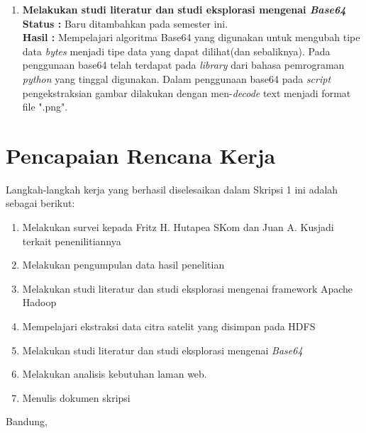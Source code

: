 \documentclass[a4paper,twoside]{article}
\begin{document}
\begin{enumerate}
		\item \textbf{Melakukan studi literatur dan studi eksplorasi mengenai \textit{Base64}}\\
		{\bf Status :} Baru ditambahkan pada semester ini.\\
		{\bf Hasil :} Mempelajari algoritma Base64 yang digunakan untuk mengubah tipe data \textit{bytes} menjadi tipe data yang dapat dilihat(dan sebaliknya). Pada penggunaan base64 telah terdapat pada \textit{library} dari bahasa pemrograman \textit{python} yang tinggal digunakan. Dalam penggunaan base64 pada \textit{script} pengekstraksian gambar dilakukan dengan men-\textit{decode} text menjadi format file ".png".
	\end{enumerate}

\section{Pencapaian Rencana Kerja}
Langkah-langkah kerja yang berhasil diselesaikan dalam Skripsi 1 ini adalah sebagai berikut:
\begin{enumerate}
\item Melakukan survei kepada Fritz H. Hutapea SKom dan Juan A. Kusjadi terkait penenilitiannya
\item Melakukan pengumpulan data hasil penelitian
\item Melakukan studi literatur dan studi eksplorasi mengenai framework Apache Hadoop
\item Mempelajari ekstraksi data citra satelit yang disimpan pada HDFS
\item Melakukan studi literatur dan studi eksplorasi mengenai \textit{Base64}
\item Melakukan analisis kebutuhan laman web.
\item Menulis dokumen skripsi
\end{enumerate}



\vspace{1cm}
\centering Bandung, \tanggal\\
\vspace{2cm} \nama \\ 
\vspace{1cm}
\end{document}
